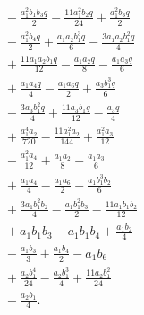 \begin{align*}
&{}- \frac{a_{1}^{2} b_{1} b_{3} q}{2} - \frac{11 a_{1}^{2} b_{2} q}{24} + \frac{a_{1}^{2} b_{3} q}{2}\\
&{}- \frac{a_{1}^{2} b_{4} q}{2} + \frac{a_{1} a_{2} b_{1}^{3} q}{6} - \frac{3 a_{1} a_{2} b_{1}^{2} q}{4}\\
&{}+ \frac{11 a_{1} a_{2} b_{1} q}{12} - \frac{a_{1} a_{2} q}{8} - \frac{a_{1} a_{3} q}{6}\\
&{}+ \frac{a_{1} a_{4} q}{4} - \frac{a_{1} a_{6} q}{2} + \frac{a_{3} b_{1}^{3} q}{6}\\
&{}- \frac{3 a_{3} b_{1}^{2} q}{4} + \frac{11 a_{3} b_{1} q}{12} - \frac{a_{3} q}{4}\\
&{}+ \frac{a_{1}^{4} a_{2}}{720} - \frac{11 a_{1}^{2} a_{2}}{144} + \frac{a_{1}^{2} a_{3}}{12}\\
&{}- \frac{a_{1}^{2} a_{4}}{12} + \frac{a_{1} a_{2}}{8} - \frac{a_{1} a_{3}}{6}\\
&{}+ \frac{a_{1} a_{4}}{4} - \frac{a_{1} a_{6}}{2} - \frac{a_{1} b_{1}^{3} b_{2}}{6}\\
&{}+ \frac{3 a_{1} b_{1}^{2} b_{2}}{4} - \frac{a_{1} b_{1}^{2} b_{3}}{2} - \frac{11 a_{1} b_{1} b_{2}}{12}\\
&{}+ a_{1} b_{1} b_{3} - a_{1} b_{1} b_{4} + \frac{a_{1} b_{2}}{4}\\
&{}- \frac{a_{1} b_{3}}{3} + \frac{a_{1} b_{4}}{2} - a_{1} b_{6}\\
&{}+ \frac{a_{2} b_{1}^{4}}{24} - \frac{a_{2} b_{1}^{3}}{4} + \frac{11 a_{2} b_{1}^{2}}{24}\\
&{}- \frac{a_{2} b_{1}}{4}.
\end{align*}
